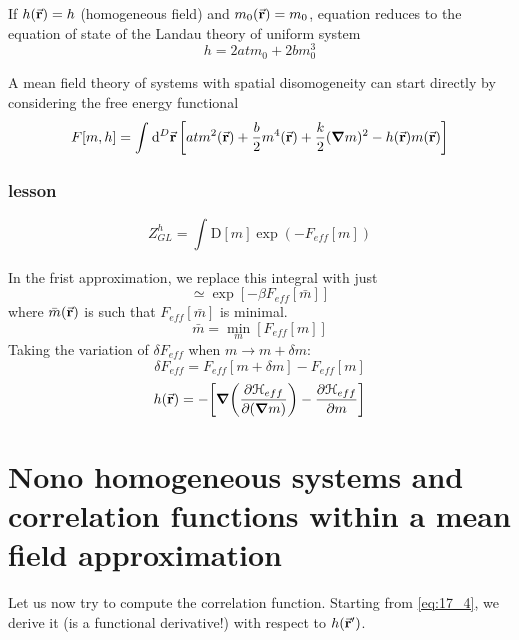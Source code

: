 \documentclass[../main/main.tex]{subfiles}
\begin{document}
\begin{remark}
If \( h (\va{r}) = h \) (homogeneous field) and \( m_0 (\va{r})=m_0 \), equation reduces to the equation of state of the Landau theory of uniform system
\begin{equation}
  h = 2 a t m_0 + 2 b m_0 ^3
\end{equation}
 \end{remark}
 \begin{remark}
 A mean field theory of systems with spatial disomogeneity can start directly by considering the free energy functional
 \begin{equation}
   F[m,h] = \int_{}^{} \dd[D]{\va{r}} \qty[a t m^2 (\va{r}) + \frac{b}{2} m^4 (\va{r}) + \frac{k}{2} (\grad m)^2 - h (\va{r}) m(\va{r})]
 \end{equation}
 \end{remark}

 \subsubsection{lesson}
 \begin{equation}
 Z_{GL}^h = \int_{}^{} \text{D}[m] \exp (-F_{eff}[m])
 \end{equation}

 In the frist approximation, we replace this integral with just
 \begin{equation}
   \simeq \exp [-\beta F_{eff} [\bar{m} ] ]
 \end{equation}
 where \( \bar{m}(\va{r})  \) is such that \( F_{eff} [\bar{m} ] \) is minimal.
 \begin{equation}
   \bar{m} =  \min_{m} [F_{eff}[m]]
 \end{equation}
 Taking the variation of \( \delta F_{eff} \) when \( m \rightarrow m + \delta m \):
 \begin{equation}
   \delta F_{eff} = F_{eff} [m+\delta m] - F_{eff} [m]
 \end{equation}
 \begin{equation}
   h (\va{r}) = - \qty[\grad \qty(\pdv{ \mathcal{H}_{eff}}{(\grad m)} ) - \pdv{\mathcal{H}_{eff}}{m}  ]
 \end{equation}




\section{Nono homogeneous systems and correlation functions within a mean field approximation}
Let us now try to compute the correlation function. Starting from \eqref{eq:17_4}, we derive it (is a functional derivative!) with respect to \( h (\va{r}')\).
\end{document}
